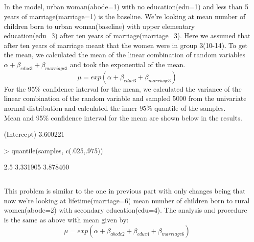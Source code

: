 \documentclass{article}
\begin{document}
\subsection{}
In the model, urban woman(abode=1) with no education(edu=1) and less than 5 years of marriage(marriage=1) is the baseline. We're looking at mean number of children born to urban woman(baseline) with upper elementary education(edu=3) after ten years of marriage(marriage=3). Here we assumed that after ten years of marriage meant that the women were in group 3(10-14). To get the mean, we calculated the mean of the linear combination of random variables $\alpha+\beta_{educ3}+\beta_{marriage3}$ and took the exponential of the mean.\\
$$\mu = exp(\alpha+\beta_{educ3}+\beta_{marriage3})$$
For the 95\% confidence interval for the mean, we calculated the variance of the linear combination of the random variable and sampled 5000 from the univariate normal distribution and calculated the inner 95\% quantile of the samples.\\
Mean and 95\% confidence interval for the mean are shown below in the results.
\begin{Schunk}
\begin{Soutput}
(Intercept) 
   3.600221 
\end{Soutput}
\begin{Sinput}
> quantile(samples, c(.025,.975))
\end{Sinput}
\begin{Soutput}
    2.5%    97.5% 
3.331905 3.878460 
\end{Soutput}
\end{Schunk}

\subsection{}
This problem is similar to the one in previous part with only changes being that now we're looking at lifetime(marriage=6) mean number of children born to rural women(abode=2) with secondary education(edu=4). The analysis and procedure is the same as above with mean given by:\\
$$\mu = exp(\alpha+\beta_{abode2}+\beta_{educ4}+\beta_{marriage6})$$
\end{document}
